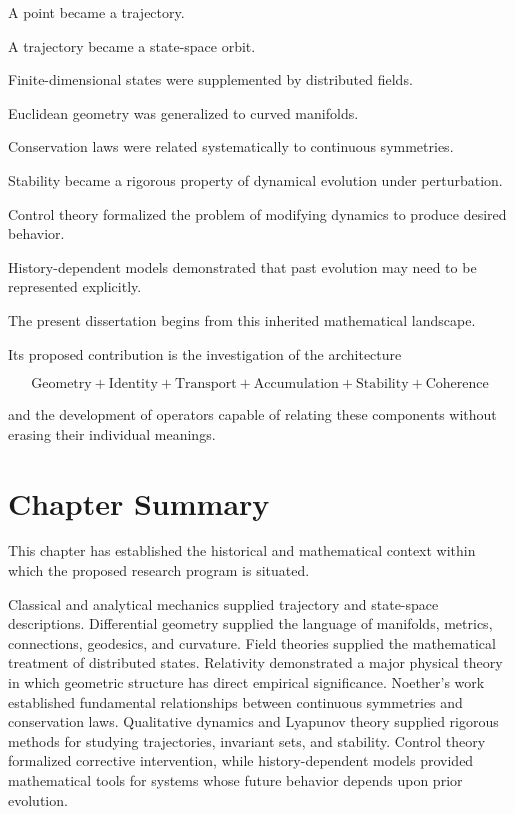 \documentclass[12pt,oneside]{book}
\begin{document}
A point became a trajectory.

A trajectory became a state-space orbit.

Finite-dimensional states were supplemented by distributed
fields.

Euclidean geometry was generalized to curved manifolds.

Conservation laws were related systematically to continuous
symmetries.

Stability became a rigorous property of dynamical evolution
under perturbation.

Control theory formalized the problem of modifying dynamics to
produce desired behavior.

History-dependent models demonstrated that past evolution may
need to be represented explicitly.

The present dissertation begins from this inherited
mathematical landscape.

Its proposed contribution is the investigation of the
architecture

\begin{equation}
    \boxed{
    \text{Geometry}
    +
    \text{Identity}
    +
    \text{Transport}
    +
    \text{Accumulation}
    +
    \text{Stability}
    +
    \text{Coherence}
    }
    \label{eq:research-architecture}
\end{equation}

and the development of operators capable of relating these
components without erasing their individual meanings.


\section{Chapter Summary}
\label{sec:historical-chapter-summary}

This chapter has established the historical and mathematical
context within which the proposed research program is situated.

Classical and analytical mechanics supplied trajectory and
state-space descriptions. Differential geometry supplied the
language of manifolds, metrics, connections, geodesics, and
curvature. Field theories supplied the mathematical treatment
of distributed states. Relativity demonstrated a major physical
theory in which geometric structure has direct empirical
significance. Noether's work established fundamental
relationships between continuous symmetries and conservation
laws. Qualitative dynamics and Lyapunov theory supplied rigorous
methods for studying trajectories, invariant sets, and
stability. Control theory formalized corrective intervention,
while history-dependent models provided mathematical tools for
systems whose future behavior depends upon prior evolution.
\end{document}
